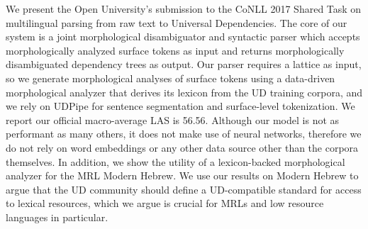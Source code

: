 We present the Open University's submission to the CoNLL 2017 Shared Task on multilingual parsing from raw text to Universal Dependencies. The core of our system is a joint morphological disambiguator and syntactic parser which accepts morphologically analyzed surface tokens as input and returns morphologically disambiguated dependency trees as output. Our parser requires a lattice as input, so we generate morphological analyses of surface tokens using a data-driven morphological analyzer that derives its lexicon from the UD training corpora, and we rely on UDPipe for sentence segmentation and surface-level tokenization. We report our official macro-average LAS is 56.56. Although our model is not as performant as many others, it does not make use of neural networks, therefore we do not rely on word embeddings or any other data source other than the corpora themselves. In addition, we show the utility of a lexicon-backed morphological analyzer for the MRL Modern Hebrew. We use our results on Modern Hebrew to argue that the UD community should define a UD-compatible standard for access to lexical resources, which we argue is crucial for MRLs and low resource languages in particular.
